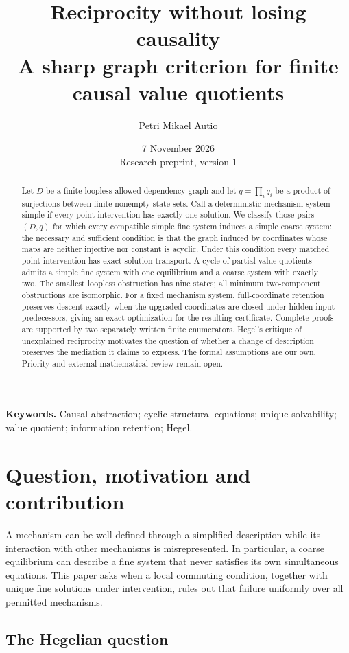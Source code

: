 \documentclass[11pt,a4paper]{article}
\title{Reciprocity without losing causality\\[5pt]\large A sharp graph criterion for finite causal value quotients}
\author{Petri Mikael Autio}
\date{7 November 2026\\\small Research preprint, version 1}
\theoremstyle{definition}
\theoremstyle{remark}
\begin{document}
\maketitle
\begin{abstract}
Let $D$ be a finite loopless allowed dependency graph and let $q=\prod_i q_i$ be a product of surjections between finite nonempty state sets. Call a deterministic mechanism system simple if every point intervention has exactly one solution. We classify those pairs $(D,q)$ for which every compatible simple fine system induces a simple coarse system: the necessary and sufficient condition is that the graph induced by coordinates whose maps are neither injective nor constant is acyclic. Under this condition every matched point intervention has exact solution transport. A cycle of partial value quotients admits a simple fine system with one equilibrium and a coarse system with exactly two. The smallest loopless obstruction has nine states; all minimum two-component obstructions are isomorphic. For a fixed mechanism system, full-coordinate retention preserves descent exactly when the upgraded coordinates are closed under hidden-input predecessors, giving an exact optimization for the resulting certificate. Complete proofs are supported by two separately written finite enumerators. Hegel's critique of unexplained reciprocity motivates the question of whether a change of description preserves the mediation it claims to express. The formal assumptions are our own. Priority and external mathematical review remain open.
\end{abstract}
\noindent\textbf{Keywords.} Causal abstraction; cyclic structural equations; unique solvability; value quotient; information retention; Hegel.

\section{Question, motivation and contribution}

A mechanism can be well-defined through a simplified description while its interaction with other mechanisms is misrepresented. In particular, a coarse equilibrium can describe a fine system that never satisfies its own simultaneous equations. This paper asks when a local commuting condition, together with unique fine solutions under intervention, rules out that failure uniformly over all permitted mechanisms.

\subsection{The Hegelian question}
\end{document}
